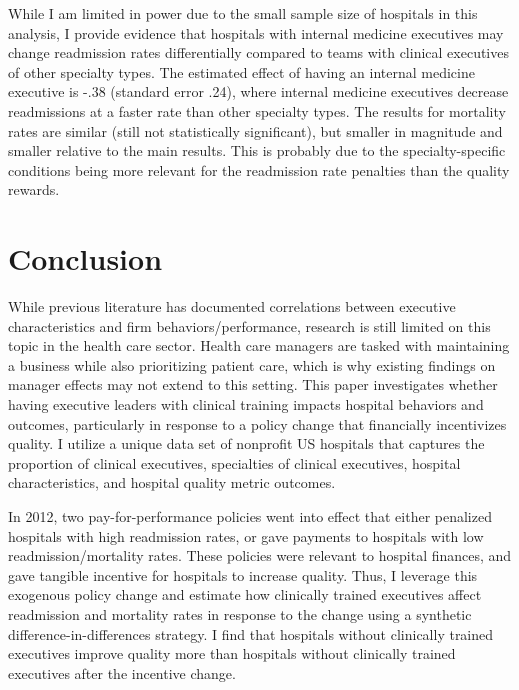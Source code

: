 \documentclass[12pt]{article}
\begin{document}
\begin{figure}[ht!]
\begin{subfigure}[b]{0.45\textwidth}
         \label{fig:mort_spec}
     \end{subfigure}
        \label{fig:specialty}
    \end{figure}

    While I am limited in power due to the small sample size of hospitals in this analysis, I provide evidence that hospitals with internal medicine executives may change readmission rates differentially compared to teams with clinical executives of other specialty types. The estimated effect of having an internal medicine executive is -.38 (standard error .24), where internal medicine executives decrease readmissions at a faster rate than other specialty types. The results for mortality rates are similar (still not statistically significant), but smaller in magnitude and smaller relative to the main results. This is probably due to the specialty-specific conditions being more relevant for the readmission rate penalties than the quality rewards. 



    \section{Conclusion}

    While previous literature has documented correlations between executive characteristics and firm behaviors/performance, research is still limited on this topic in the health care sector. Health care managers are tasked with maintaining a business while also prioritizing patient care, which is why existing findings on manager effects may not extend to this setting. This paper investigates whether having executive leaders with clinical training impacts hospital behaviors and outcomes, particularly in response to a policy change that financially incentivizes quality. I utilize a unique data set of nonprofit US hospitals that captures the proportion of clinical executives, specialties of clinical executives, hospital characteristics, and hospital quality metric outcomes. 

    In 2012, two pay-for-performance policies went into effect that either penalized hospitals with high readmission rates, or gave payments to hospitals with low readmission/mortality rates. These policies were relevant to hospital finances, and gave tangible incentive for hospitals to increase quality. Thus, I leverage this exogenous policy change and estimate how clinically trained executives affect readmission and mortality rates in response to the change using a synthetic difference-in-differences strategy. I find that hospitals without clinically trained executives improve quality more than hospitals without clinically trained executives after the incentive change. 
    
\end{document}
